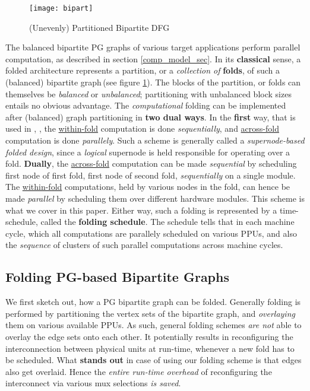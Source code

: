 \documentclass[12pt]{article}
\begin{document}
\begin{figure}[h]
\begin{center}
\texttt{[image: bipart]}
\end{center}
\caption{(Unevenly) Partitioned Bipartite DFG}
\label{fold_bp}
\end{figure}

The balanced bipartite PG graphs of various target applications perform
parallel computation, as described in section \ref{comp_model_sec}.  In its
\textbf{classical} sense, a folded architecture represents a partition, or
a \textit{collection of} \textbf{folds}, of such a (balanced) bipartite graph\,(see figure
\ref{fold_bp}). The blocks of the partition, or folds can themselves be
\textit{balanced} or \textit{unbalanced}; partitioning with unbalanced block sizes entails no
obvious advantage.  The \textit{computational} folding can be implemented
after (balanced) graph partitioning in \textbf{two dual ways}. In
the \textbf{first} way, that is
used in \cite{cacs_pap}, \cite{dam_pap}, the \uline{within-fold}
computation is done
\textit{sequentially}, and \uline{across-fold} computation is done
\textit{parallely}. Such a scheme is generally
called a \textit{supernode-based folded design}, since a \textit{logical}
supernode is held responsible for operating over a fold. \textbf{Dually},
the \uline{across-fold} computation can be made \textit{sequential} by scheduling
first node of first fold, first node of second fold, 
\textit{sequentially} on a single module.  The \uline{within-fold}
computations, held by various nodes in the fold, can hence be made
\textit{parallel} by scheduling them over different hardware modules. This
scheme is what we cover in this paper.
Either way, such a folding is represented by a time-schedule, called the
\textbf{folding schedule}. The schedule tells that in each machine cycle,
which all computations are parallely scheduled on various
PPUs,
and also the \textit{sequence} of clusters of such parallel computations
across machine cycles.

\subsection{Folding PG-based Bipartite Graphs}
\label{bipart_fold_sec}
We first sketch out, how a PG bipartite graph can be folded. Generally
folding is performed by partitioning the vertex sets of the bipartite
graph, and \textit{overlaying} them on various available PPUs.
As such, general folding schemes \textit{are not} able to overlay the edge sets onto
each other. It potentially results in reconfiguring the
interconnection between physical units at run-time, whenever a new
fold has to be scheduled. What \textbf{stands
out} in case of using our folding scheme is that edges also
get overlaid. Hence the \textit{entire run-time overhead} of reconfiguring the
interconnect via various mux selections \textit{is saved}.
\end{document}
